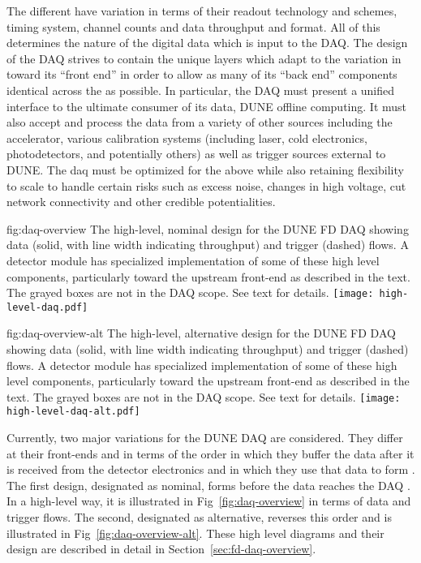 The different  have variation in terms of their
readout technology and schemes, timing system, channel counts and data
throughput and format.
All of this determines the nature of the digital data which is input
to the DAQ. 
The design of the DAQ strives to contain the unique layers which adapt
to the variation in  toward its ``front end'' in
order to allow as many of its ``back end'' components identical across
the  as possible. 
In particular, the DAQ must present a unified interface to the
ultimate consumer of its data, DUNE offline computing.
It must also accept and process the data from a variety of other
sources including the accelerator, various calibration systems
(including laser, cold electronics, photodetectors, and potentially
others) as well as trigger sources external to DUNE. 
The daq must be optimized for the above while also retaining
flexibility to scale to handle certain risks such as excess noise,
changes in high voltage, cut network connectivity and other credible
potentialities.

\begin{dunefigure}{fig:daq-overview}
  {The high-level, nominal design for the DUNE FD DAQ showing data (solid, with
    line width indicating throughput) and trigger (dashed) flows. 
    A detector module has specialized implementation of some of these
    high level components, particularly toward the upstream front-end
    as described in the text. 
    The grayed boxes are not in the DAQ scope.
    See text for details.
}
\texttt{[image: high-level-daq.pdf]}%
\end{dunefigure}

\begin{dunefigure}{fig:daq-overview-alt}
  {The high-level, alternative design for the DUNE FD DAQ showing data (solid, with
    line width indicating throughput) and trigger (dashed) flows. 
    A detector module has specialized implementation of some of these
    high level components, particularly toward the upstream front-end
    as described in the text. 
    The grayed boxes are not in the DAQ scope.
    See text for details.
}
\texttt{[image: high-level-daq-alt.pdf]}%
\end{dunefigure}

Currently, two major variations for the DUNE DAQ are considered. 
They differ at their front-ends and in terms of the order in which
they buffer the data after it is received from the detector
electronics and in which they use that data to form
.
The first design, designated as nominal, forms 
before the data reaches the DAQ . 
In a high-level way, it is illustrated in Fig~\ref{fig:daq-overview}
in terms of data and trigger flows.
The second, designated as alternative, reverses this order and is
illustrated in Fig~\ref{fig:daq-overview-alt}. 
These high level diagrams and their design are described in
detail in Section~\ref{sec:fd-daq-overview}.

